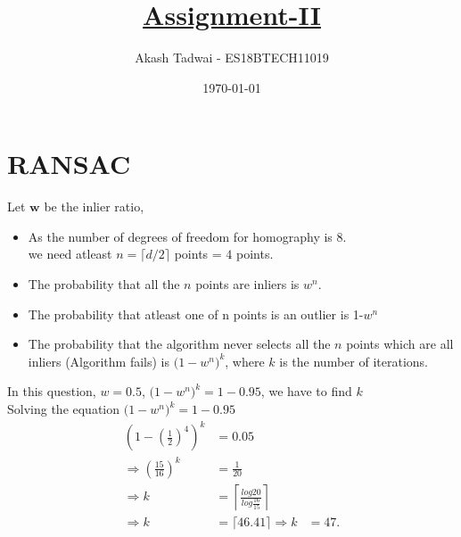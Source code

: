 \documentclass[english,a4paper,12pt]{article}
\title{\textbf{\underline{\Huge{Assignment-II }}}}
\author{Akash Tadwai - ES18BTECH11019
}
\date{\today}
\begin{document}
\maketitle

\section{RANSAC}{

Let $\mathbf{w}$ be the inlier ratio,
\begin{itemize}
    \item As the number of degrees of freedom for homography is $8$.\\
    we need atleast $n=\lceil d/2 \rceil $ points  = $4$ points.
    \item The probability that all the $n$ points are inliers is $w^n$.
    \item The probability that atleast one of n points is an outlier is 1-$w^n$
    \item The probability that the algorithm never selects all the $n$ points which are all inliers (Algorithm fails) is $ {(1-w^{n}})^k$, where $k$ is the number of iterations.
\end{itemize}
In this question, $w = 0.5$, $ {(1-w^{n}})^k=1-0.95$, we have to find $k$ \\
Solving the equation ${(1-w^{n}})^k=1-0.95$ \\
$$
\begin{aligned}
   \left({1 - \left(\frac{1}{2}\right)^4}\right)^k &= 0.05 \\
\Rightarrow \left( \frac{15}{16} \right)^k &= \frac{1}{20}\\
\Rightarrow k &= \left \lceil \frac{log20}{log\frac{16}{15}} \right \rceil  \\
\Rightarrow k &= \lceil 46.41 \rceil
\Rightarrow k&= 47.
\end{aligned}
$$
}
\end{document}
